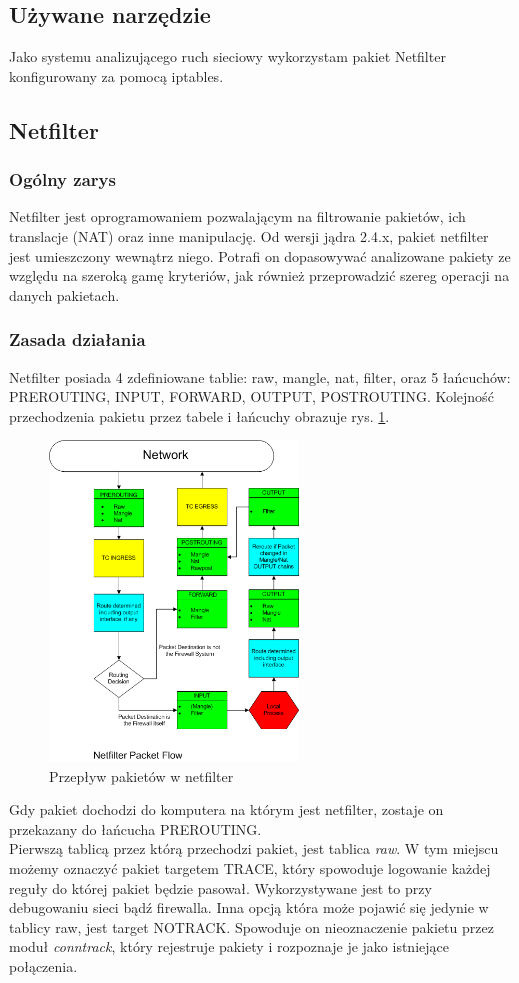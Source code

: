 \documentclass[a4paper,10pt,twoside]{book}
\begin{document}
		\subsection{Używane narzędzie}
			Jako systemu analizującego ruch sieciowy wykorzystam pakiet Netfilter konfigurowany za pomocą iptables.
		\subsection{Netfilter}
			\subsubsection{Ogólny zarys}
				Netfilter jest oprogramowaniem pozwalającym na filtrowanie pakietów, ich translacje (NAT) oraz inne manipulację.
				Od wersji jądra 2.4.x, pakiet netfilter jest umieszczony wewnątrz niego.
				Potrafi on dopasowywać analizowane pakiety ze względu na szeroką gamę kryteriów, jak również przeprowadzić szereg operacji na danych pakietach.
			\subsubsection{Zasada działania}
				Netfilter posiada 4 zdefiniowane tablie: raw, mangle, nat, filter, oraz 5 łańcuchów: PREROUTING, INPUT, FORWARD, OUTPUT, POSTROUTING.
				Kolejność przechodzenia pakietu przez tabele i łańcuchy obrazuje rys. \ref{fig:flowchart}.\\
				\begin{figure}[h]
					\centering
						\includegraphics[width=250px]{Netfilter}
						\caption{Przepływ pakietów w netfilter}
						\label{fig:flowchart}
				\end{figure}
				Gdy pakiet dochodzi do komputera na którym jest netfilter, zostaje on przekazany do łańcucha PREROUTING.\\
				Pierwszą tablicą przez którą przechodzi pakiet, jest tablica \textit{raw}. W tym miejscu możemy oznaczyć pakiet targetem TRACE, który spowoduje logowanie każdej reguły do której pakiet będzie pasował. Wykorzystywane jest to przy debugowaniu sieci bądź firewalla.
				Inna opcją która może pojawić się jedynie w tablicy raw, jest target NOTRACK. Spowoduje on nieoznaczenie pakietu przez moduł \textit{conntrack}, który rejestruje pakiety i rozpoznaje je jako istniejące połączenia.
\end{document}
